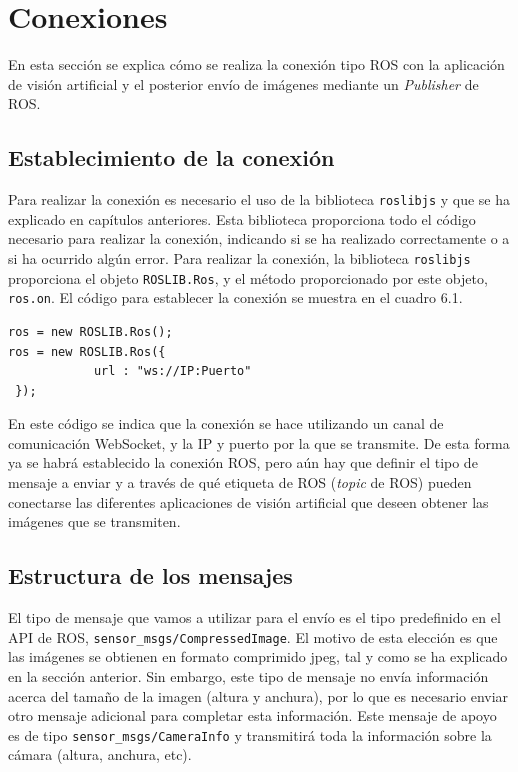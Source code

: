 \section{Conexiones}
En esta sección se explica cómo se realiza la conexión tipo ROS con la aplicación de visión artificial y el posterior envío de imágenes mediante un \textit{Publisher} de ROS. 

\subsection{Establecimiento de la conexión}
Para realizar la conexión es necesario el uso de la biblioteca \texttt{roslibjs} y que se ha explicado en capítulos anteriores. Esta biblioteca proporciona todo el código necesario para realizar la conexión, indicando si se ha realizado correctamente o a si ha ocurrido algún error. Para realizar la conexión, la biblioteca \texttt{roslibjs} proporciona el objeto \texttt{ROSLIB.Ros}, y el método proporcionado por este objeto, \texttt{ros.on}. El código para establecer la conexión se muestra en el cuadro 6.1.
\begin{lstlisting}[caption= Establecer conexión con ROS, label=cod.conexionRosCamserver]
ros = new ROSLIB.Ros();
ros = new ROSLIB.Ros({
            url : "ws://IP:Puerto"
 });
\end{lstlisting}
En este código se indica que la conexión se hace utilizando un canal de comunicación WebSocket, y la IP y puerto por la que se transmite. De esta forma ya se habrá establecido la conexión ROS, pero aún hay que definir el tipo de mensaje a enviar y a través de qué etiqueta de ROS (\textit{topic} de ROS) pueden conectarse las diferentes aplicaciones de visión artificial que deseen obtener las imágenes que se transmiten.

\subsection{Estructura de los mensajes}
El tipo de mensaje que vamos a utilizar para el envío es el tipo predefinido en el API de ROS, \texttt{sensor\_msgs/CompressedImage}. El motivo de esta elección es que las imágenes se obtienen en formato comprimido jpeg, tal y como se ha explicado en la sección anterior. Sin embargo, este tipo de mensaje no envía información acerca del tamaño de la imagen (altura y anchura), por lo que es necesario enviar otro mensaje adicional para completar esta información. Este mensaje de apoyo es de tipo \texttt{sensor\_msgs/CameraInfo} y transmitirá toda la información sobre la cámara (altura, anchura, etc). 

